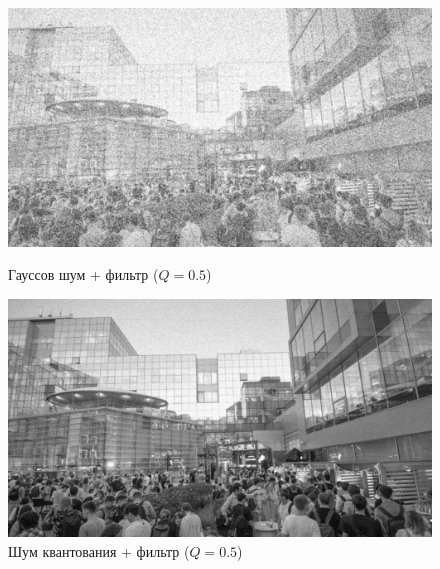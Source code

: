 \documentclass[a4paper]{article}
\begin{document}
\begin{figure}[H]
    \begin{minipage}{0.49\textwidth}
        \centering \includegraphics[width=\textwidth]{images/2_low_filters/gaussian - contrharmonic (Q=0.5).jpg}
        \caption{Гауссов шум + фильтр ($Q = 0.5$)}
    \end{minipage}\hfill
    \begin{minipage}{0.49\textwidth}
        \centering \includegraphics[width=\textwidth]{images/2_low_filters/poisson - contrharmonic (Q=0.5).jpg}
        \caption{Шум квантования + фильтр ($Q = 0.5$)}
    \end{minipage}
\end{figure}
\end{document}
